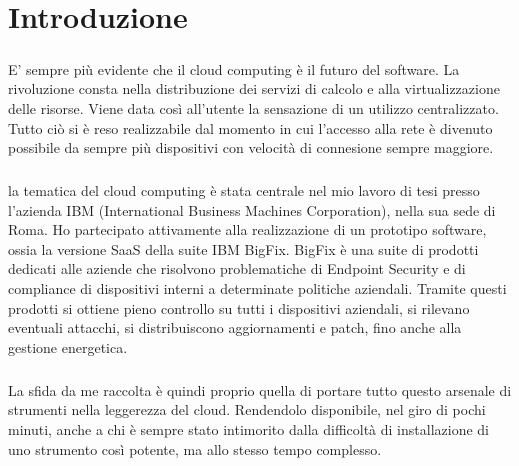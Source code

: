 \chapter{Introduzione}

\paragraph{}
E' sempre più evidente che il cloud computing è il futuro del software. La rivoluzione consta nella distribuzione dei servizi di calcolo e alla virtualizzazione delle risorse. Viene data così all'utente la sensazione di un utilizzo centralizzato. Tutto ciò si è reso realizzabile dal momento in cui l'accesso alla rete è divenuto possibile da sempre più dispositivi con velocità di connesione sempre maggiore.
\paragraph{}
la tematica del cloud computing è stata centrale nel mio lavoro di tesi presso l'azienda IBM (International Business Machines Corporation), nella sua sede di Roma. Ho partecipato attivamente alla realizzazione di un prototipo software, ossia la versione SaaS della suite IBM BigFix. BigFix è una suite di prodotti dedicati alle aziende che risolvono problematiche di Endpoint Security e di compliance di dispositivi interni a determinate politiche aziendali. Tramite questi prodotti si ottiene pieno controllo su tutti i dispositivi aziendali, si rilevano eventuali attacchi, si distribuiscono aggiornamenti e patch, fino anche alla gestione energetica.
\paragraph{}
La sfida da me raccolta è quindi proprio quella di portare tutto questo arsenale di strumenti nella leggerezza del cloud. Rendendolo disponibile, nel giro di pochi minuti, anche a chi è sempre stato intimorito dalla difficoltà di installazione di uno strumento così potente, ma allo stesso tempo complesso.